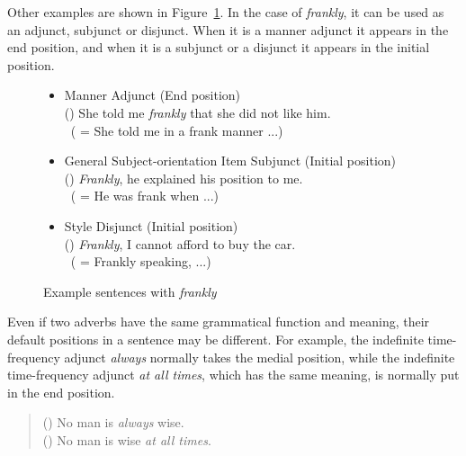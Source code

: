 Other examples are shown in Figure~\ref{fig:frankly}.
In the case of {\em frankly}, it can be used as an adjunct, subjunct or 
disjunct. When it is a manner adjunct it appears in the end position, and
when it is a subjunct or a disjunct it appears in the initial position.

\begin{singlespace}
\begin{figure}[tbp]
  \begin{center}
    \leavevmode
    \small
    \begin{itemize}
       \item Manner Adjunct (End position)\\
       ()
       She told me {\em frankly} that she did not like him. \\
       \ ( = She told me in a frank manner ...)
       \item General Subject-orientation Item Subjunct (Initial position)\\
       ()
       {\em Frankly}, he explained his position to me. \\
       \ ( = He was frank when ...)
       \item Style Disjunct (Initial position)\\
       ()
       {\em Frankly}, I cannot afford to buy the car. \\
       \ ( = Frankly speaking, ...)
    \end{itemize}
  \end{center}
  \vspace*{-3mm}
  \caption{Example sentences with {\em frankly}}
  \label{fig:frankly}
\end{figure}
\end{singlespace}

Even if two adverbs have the same grammatical function and meaning,
their default positions in a sentence may be different.  For example,
the indefinite time-frequency adjunct {\em always} normally takes the
medial position, while the indefinite time-frequency adjunct {\em at
  all times}, which has the same meaning, is normally put in the end
position.

\smallskip
\begin{quote}
 \small
 () No man is {\em always} wise. \\
 () No man is wise {\em at all times}.
\end{quote}

